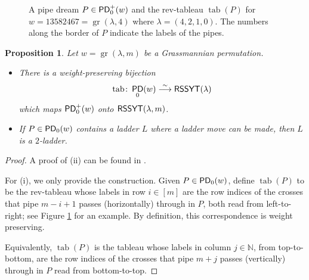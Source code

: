 \documentclass[11pt,reqno]{amsart} %
\makeatletter
\newcommand{\bbN}{\mathbb{N}}
\DeclareMathOperator{\Grass}{gr}
\DeclareMathOperator{\PD}{\sf{PD}}
\DeclareMathOperator{\RSSYT}{\sf{RSSYT}}
\DeclareMathOperator{\tab}{tab}
\newenvironment{shift}[1][(0,0)]{
    \begin{scope}[shift={#1}]
}{
    \end{scope}
}
\newtheorem{proposition}[theorem]{Proposition}
\theoremstyle{definition}
\newcommand{\drawHorizontal}[3][color=pipe color]{
    \draw[#1,very thick]
    (#2-0.5,#3) to (#2+0.5,#3);
}
\newcommand{\drawVertical}[3][color=pipe color]{
    \draw[#1,very thick]
    (#2,#3-0.5) to (#2,#3+0.5);
}
\newcommand{\drawRelbow}[3][color=pipe color]{
    \draw[#1,very thick]
    (#2,#3-0.5) to (#2,#3-0.25) to[bend left] (#2+0.25,#3) to (#2+0.5,#3);
}
\newcommand{\drawJelbow}[3][color=pipe color]{
    \draw[#1,very thick]
    (#2-0.5,#3) to (#2-0.25,#3) to[bend right] (#2,#3+0.25) to (#2,#3+0.5);
}
\newcommand{\drawBump}[3][color=pipe color]{
    \drawRelbow[#1]{#2}{#3}
    \drawJelbow[#1]{#2}{#3}
}
\newcommand{\drawSquare}[3][black,opacity=0.5]{
    \draw[#1,thin]
    (#2-0.5,#3+0.5) rectangle (#2+0.5,#3-0.5);
}
\newcommand{\drawXCross}[2]{
    \fill[color=x color 2]
    (#1-1/2,#2) -- (#1-1/4,#2+1/4) -- (#1+1/4,#2+1/4) -- (#1+1/2,#2) -- (#1+1/4,#2-1/4) -- (#1-1/4,#2-1/4);
    \drawHorizontal[x color 1]{#1}{#2}
    \drawVertical[x color 1]{#1}{#2}
}
\newcommand{\drawYCross}[2]{
    \fill[color=y color 2]
    (#1,#2-1/2) -- (#1+1/4,#2-1/4) -- (#1+1/4,#2+1/4) -- (#1,#2+1/2) -- (#1-1/4,#2+1/4) -- (#1-1/4,#2-1/4);
    \drawHorizontal[y color 1]{#1}{#2}
    \drawVertical[y color 1]{#1}{#2}
}
\newcommand{\drawXYCross}[2]{
    \fill[color=y color 2] (#1,#2) -- (#1+1/4,#2+1/4) -- (#1,#2+1/2) -- (#1-1/4,#2+1/4);
    \fill[color=y color 2] (#1,#2) -- (#1+1/4,#2-1/4) -- (#1,#2-1/2) -- (#1-1/4,#2-1/4);
    \fill[color=x color 2] (#1,#2) -- (#1+1/4,#2+1/4) -- (#1+1/2,#2) -- (#1+1/4,#2-1/4);
    \fill[color=x color 2] (#1,#2) -- (#1-1/4,#2+1/4) -- (#1-1/2,#2) -- (#1-1/4,#2-1/4);
    \drawVertical[y color 1]{#1}{#2}
    \drawHorizontal[x color 1]{#1}{#2}
}
\newcommand{\drawPDTile}[3]{

    \ifnum #3=0 \drawBump{#1}{#2} \fi
    \ifnum #3=1 \drawXCross{#1}{#2} \fi
    \ifnum #3=2 \drawYCross{#1}{#2} \fi
    \ifnum #3=3 \drawXYCross{#1}{#2}\fi
    \ifnum #3=4 \fi
    \ifnum #3=5 \fi
    \ifnum #3=6 \fi
    \ifnum #3=7 \fi
    \ifnum #3=8 \drawRelbow{#1}{#2} \fi
    \ifnum #3=9 \fi %
}
\newcommand{\drawPD}[3]{
    \PD@i = 1
    \PD@j = 1
    \foreach \t in {#3}{
        \drawPDTile{\number\PD@j}{-\number\PD@i}{\t}
        \drawSquare{\number\PD@j}{-\number\PD@i}
        
        \ifnum\PD@j < \numexpr#2\relax
            \global\advance\PD@j by 1
        \else
            \global\PD@j = 1
            \global\advance\PD@i by 1
        \fi
    }
}
\newcommand{\drawNorthLabels}[3]{
    \PD@j = 0
    \foreach \j in {#3}{
        \node at (#2+\PD@j,-#1) {\j};
        \global\advance\PD@j by 1
    }
}
\newcommand{\drawWestLabels}[3]{
    \PD@i = 0
    \foreach \i in {#3}{
        \node at (#2,-#1-\PD@i) {\i};
        \global\advance\PD@i by 1
    }
}
\makeatother
\begin{document}
\begin{figure}
    
\caption{
    A pipe dream $P\in \PD_0^+(w)$ and the rev-tableau $\tab(P)$ for $w = 13582467 = \Grass(\lambda,4)$ where $\lambda = (4,2,1,0)$.
    The numbers along the border of $P$ indicate the labels of the pipes.
}
\label{fig:grassmannian pipe dream}
\end{figure}

\begin{proposition}
\label{prop:grassmannian}
Let $w = \Grass(\lambda,m)$ be a Grassmannian permutation.
\begin{itemize}
\item[(i)]
There is a weight-preserving bijection \[
    \tab\colon \PD_0(w) \overset\sim\longrightarrow \RSSYT(\lambda)
\] which maps $\PD_0^+(w)$ onto $\RSSYT(\lambda,m)$.
\item[(ii)]
If $P\in \PD_0(w)$ contains a ladder $L$ where a ladder move can be made, then $L$ is a $2$-ladder.
\end{itemize}
\end{proposition}

\begin{proof}
A proof of (ii) can be found in \cite{Gao21}.

For (i), we only provide the construction.
Given $P\in \PD_0(w)$, define $\tab(P)$ to be the rev-tableau whose labels in row $i\in[m]$ are the row indices of the crosses that pipe $m-i+1$ passes (horizontally) through in $P$, both read from left-to-right; see Figure \ref{fig:grassmannian pipe dream} for an example.
By definition, this correspondence is weight preserving.

Equivalently, $\tab(P)$ is the tableau whose labels in column $j\in\bbN$, from top-to-bottom, are the row indices of the crosses that pipe $m+j$ passes (vertically) through in $P$ read from bottom-to-top.
\end{proof}
\end{document}
